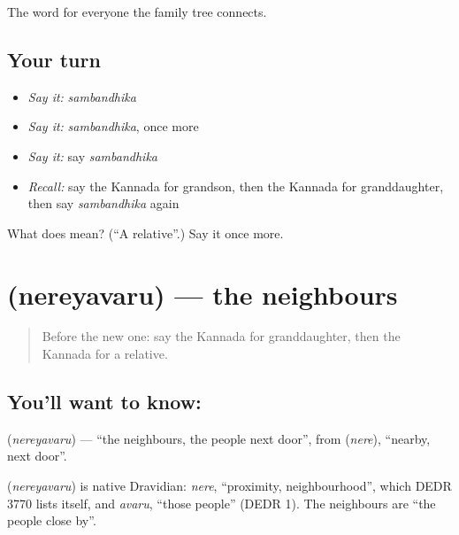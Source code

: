 \begin{grammarlens}[title={What you've built}]
The word for everyone the family tree connects.
\end{grammarlens}

\subsection*{Your turn}
\begin{itemize}
\raggedright
  \item \emph{Say it:} \emph{sambandhika}
  \item \emph{Say it:} \emph{sambandhika}, once more
  \item \emph{Say it:} say \emph{sambandhika}
  \item \emph{Recall:} say the Kannada for grandson, then the Kannada for granddaughter, then say \emph{sambandhika} again
\end{itemize}

\begin{tcolorbox}[breakable,colback=teal!4,colframe=teal!35!black,title={Before you move on}]
What does  mean? (\textquotedblleft{}A relative\textquotedblright{}.) Say it once more.
\end{tcolorbox}
\section[\texorpdfstring{\kn{ನೆರೆಯವರು} (nereyavaru)}{ನೆರೆಯವರು (nereyavaru)}]{ (nereyavaru) — the neighbours}

\label{lesson:KA-C90-neighbours}



\begin{quote}
Before the new one: say the Kannada for granddaughter, then the Kannada for a relative.
\end{quote}

\subsection*{You'll want to know: }
\textbf{} (\emph{nereyavaru}) — \textquotedblleft{}the neighbours, the people next door\textquotedblright{}, from \textbf{} (\emph{nere}), \textquotedblleft{}nearby, next door\textquotedblright{}.

\begin{cousinweb}
\textbf{} (\emph{nereyavaru}) is native Dravidian: \emph{nere}, \textquotedblleft{}proximity, neighbourhood\textquotedblright{}, which DEDR 3770 lists itself, and \emph{avaru}, \textquotedblleft{}those people\textquotedblright{} (DEDR 1). The neighbours are \textquotedblleft{}the people close by\textquotedblright{}.
\end{cousinweb}

